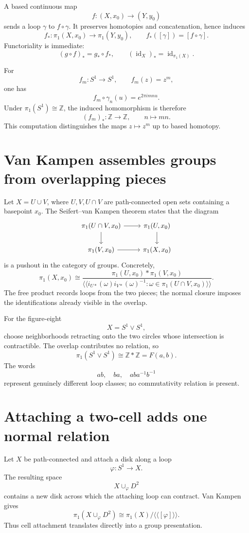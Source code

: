 A based continuous map
\[
  f:(X,x_0)\to(Y,y_0)
\]
sends a loop \(\gamma\) to \(f\circ\gamma\).  It preserves homotopies and concatenation, hence induces
\[
  f_*:\pi_1(X,x_0)\to\pi_1(Y,y_0),
  \qquad
  f_*([\gamma])=[f\circ\gamma].
\]
Functoriality is immediate:
\[
  (g\circ f)_*=g_*\circ f_*,
  \qquad
  (\operatorname{id}_X)_*=\operatorname{id}_{\pi_1(X)}.
\]

For
\[
  f_m:S^1\to S^1,
  \qquad
  f_m(z)=z^m,
\]
one has
\[
  f_m\circ\gamma_n(u)=e^{2\pi i mn u}.
\]
Under \(\pi_1(S^1)\cong\mathbb Z\), the induced homomorphism is therefore
\[
  (f_m)_*:\mathbb Z\to\mathbb Z,
  \qquad
  n\longmapsto mn.
\]
This computation distinguishes the maps \(z\mapsto z^m\) up to based homotopy.

\section{Van Kampen assembles groups from overlapping pieces}

Let \(X=U\cup V\), where \(U,V,U\cap V\) are path-connected open sets containing a basepoint \(x_0\).  The Seifert--van Kampen theorem states that the diagram
\[
\begin{tikzcd}
\pi_1(U\cap V,x_0) \arrow[r] \arrow[d]
  & \pi_1(U,x_0) \arrow[d] \\
\pi_1(V,x_0) \arrow[r]
  & \pi_1(X,x_0)
\end{tikzcd}
\]
is a pushout in the category of groups.  Concretely,
\[
  \pi_1(X,x_0)
  \cong
  \frac{\pi_1(U,x_0)*\pi_1(V,x_0)}
  {\langle\!\langle i_{U*}(\omega)i_{V*}(\omega)^{-1}:\omega\in\pi_1(U\cap V,x_0)\rangle\!\rangle}.
\]
The free product records loops from the two pieces; the normal closure imposes the identifications already visible in the overlap.

For the figure-eight
\[
  X=S^1\vee S^1,
\]
choose neighborhoods retracting onto the two circles whose intersection is contractible.  The overlap contributes no relation, so
\[
  \boxed{\pi_1(S^1\vee S^1)\cong\mathbb Z*\mathbb Z=F(a,b).}
\]
The words
\[
  ab,
  \quad
  ba,
  \quad
  aba^{-1}b^{-1}
\]
represent genuinely different loop classes; no commutativity relation is present.

\section{Attaching a two-cell adds one normal relation}

Let \(X\) be path-connected and attach a disk along a loop
\[
  \varphi:S^1\to X.
\]
The resulting space
\[
  X\cup_\varphi D^2
\]
contains a new disk across which the attaching loop can contract.  Van Kampen gives
\[
  \pi_1(X\cup_\varphi D^2)
  \cong
  \pi_1(X)/\langle\!\langle[\varphi]\rangle\!\rangle.
\]
Thus cell attachment translates directly into a group presentation.

